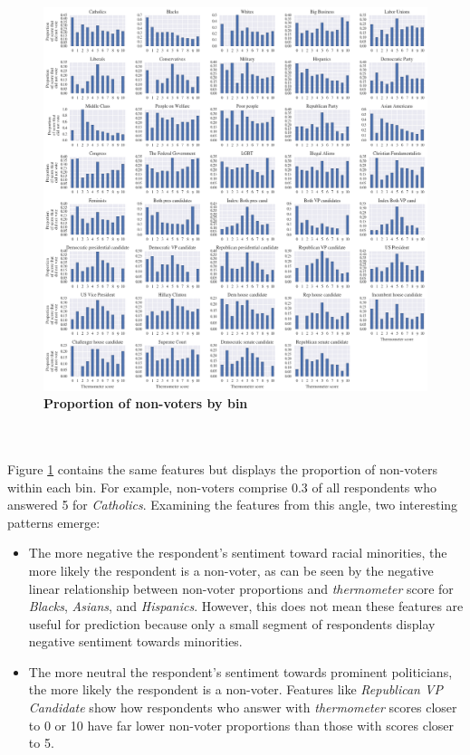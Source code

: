 \documentclass{article}
\begin{document}
	\begin{figure}[h!]
		\begin{center}
			\includegraphics*[width=1\linewidth]{thermometer_nonvoters}
			\caption{\textbf{Proportion of non-voters by bin}}
			\label{fig:thermometer_nonvoters}
		\end{center}
	\end{figure}

	\hfill \\\\
	Figure \ref{fig:thermometer_nonvoters} contains the same features but displays the proportion of non-voters within each bin. For example, non-voters comprise 0.3 of all respondents who answered 5 for \textit{Catholics}. Examining the features from this angle, two interesting patterns emerge:
	\begin{itemize}
		\item{The more negative the respondent's sentiment toward racial minorities, the more likely the respondent is a non-voter, as can be seen by the negative linear relationship between non-voter proportions and \textit{thermometer} score for \textit{Blacks}, \textit{Asians}, and \textit{Hispanics}. However, this does not mean these features are useful for prediction because only a small segment of respondents display negative sentiment towards minorities.}
		\item{The more neutral the respondent's sentiment towards prominent politicians, the more likely the respondent is a non-voter. Features like \textit{Republican VP Candidate} show how respondents who answer with \textit{thermometer} scores closer to 0 or 10 have far lower non-voter proportions than those with scores closer to 5.}
	\end{itemize}
\end{document}
